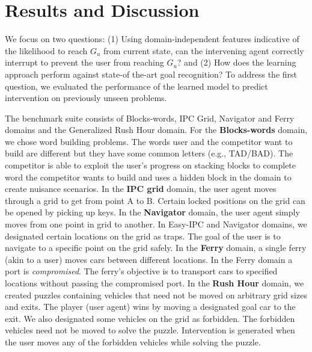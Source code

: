 \documentclass[letterpaper]{article}
\theoremstyle{plain}
\begin{document}
\section{Results and Discussion}
We focus on two questions: (1) Using domain-independent features indicative of the likelihood to reach $G_u$ from current state, can the intervening agent correctly interrupt to prevent the user from reaching $G_u$? and (2) How does the learning approach perform against state-of the-art goal recognition? To address the first question, we evaluated the performance of the learned model to predict intervention on previously unseen problems.

The benchmark suite consists of Blocks-words, IPC Grid, Navigator and Ferry domains and the Generalized Rush Hour domain. For the \textbf{Blocks-words} domain, we chose word building problems. The words user and the competitor want to build are different but they have some common letters (e.g., TAD/BAD). The competitor is able to exploit the user's progress on stacking blocks to complete word the competitor wants to build and uses a hidden block in the domain to create nuisance scenarios. In the \textbf{IPC grid} domain, the user agent moves through a grid to get from point A to B. Certain locked positions on the grid can be opened by picking up keys. In the \textbf{Navigator} domain, the user agent simply moves from one point in grid to another. In Easy-IPC and Navigator domains, we designated certain locations on the grid as traps. The goal of the user is to navigate to a specific point on the grid safely. In the \textbf{Ferry} domain, a single ferry (akin to a user) moves cars between different locations. In the Ferry domain a port is \emph{compromised}. The ferry's objective is to transport cars to specified locations without passing the compromised port. In the \textbf{Rush Hour} domain, we created puzzles containing vehicles that need not be moved on arbitrary grid sizes and exits. The player (user agent) wins by moving a designated goal car to the exit. We also designated some vehicles on the grid as forbidden. The forbidden vehicles need not be moved to solve the puzzle. Intervention is generated when the user moves any of the forbidden vehicles while solving the puzzle.
\end{document}
